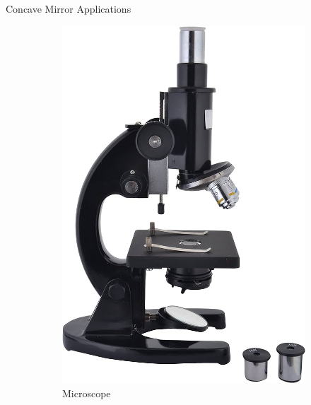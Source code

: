 \documentclass{beamer}
\begin{document}
\begin{frame}{Concave Mirror Applications}
	\begin{figure}
		\centering
		\begin{subfigure}[b]{0.3\textwidth}
			\centering
			\includegraphics[width=\textwidth]{45.jpg}
			\caption{Microscope}
			\label{Refraction}
		\end{subfigure}
		\hfill
		\begin{subfigure}[b]{0.3\textwidth}
			\centering

\end{subfigure}
\end{figure}
\end{frame}
\end{document}
